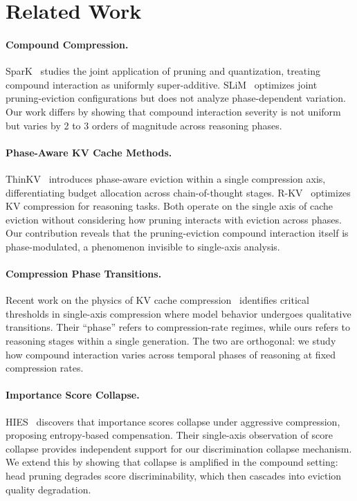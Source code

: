 \documentclass[11pt,a4paper]{article}
\begin{document}
\section{Related Work}

\paragraph{Compound Compression.}
SparK~\cite{spark2024} studies the joint application of pruning and quantization, treating compound interaction as uniformly super-additive. SLiM~\cite{slim2024} optimizes joint pruning-eviction configurations but does not analyze phase-dependent variation. Our work differs by showing that compound interaction severity is not uniform but varies by 2 to 3 orders of magnitude across reasoning phases.

\paragraph{Phase-Aware KV Cache Methods.}
ThinKV~\cite{thinkv2025} introduces phase-aware eviction within a single compression axis, differentiating budget allocation across chain-of-thought stages. R-KV~\cite{rkv2025} optimizes KV compression for reasoning tasks. Both operate on the single axis of cache eviction without considering how pruning interacts with eviction across phases. Our contribution reveals that the pruning-eviction compound interaction itself is phase-modulated, a phenomenon invisible to single-axis analysis.

\paragraph{Compression Phase Transitions.}
Recent work on the physics of KV cache compression~\cite{physicskv2026} identifies critical thresholds in single-axis compression where model behavior undergoes qualitative transitions. Their ``phase'' refers to compression-rate regimes, while ours refers to reasoning stages within a single generation. The two are orthogonal: we study how compound interaction varies across temporal phases of reasoning at fixed compression rates.

\paragraph{Importance Score Collapse.}
HIES~\cite{hies2025} discovers that importance scores collapse under aggressive compression, proposing entropy-based compensation. Their single-axis observation of score collapse provides independent support for our discrimination collapse mechanism. We extend this by showing that collapse is amplified in the compound setting: head pruning degrades score discriminability, which then cascades into eviction quality degradation.
\end{document}
